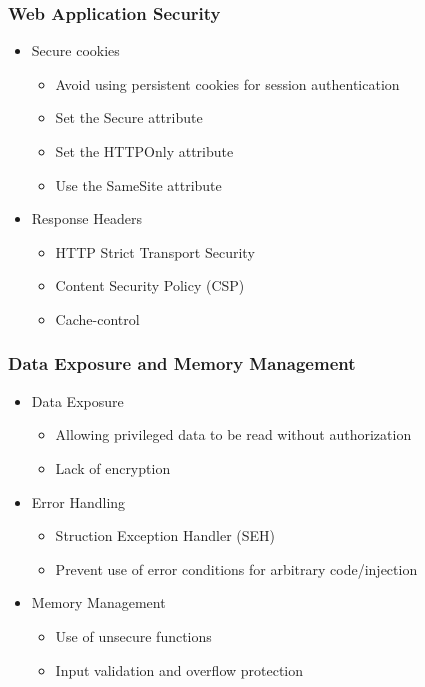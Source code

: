 		\subsubsection {Web Application Security}
			\begin{itemize}
				\item Secure cookies
					\begin{itemize}
						\item Avoid using persistent cookies for session authentication
						\item Set the Secure attribute
						\item Set the HTTPOnly attribute
						\item Use the SameSite attribute
					\end{itemize}
				\item Response Headers
					\begin{itemize}
						\item HTTP Strict Transport Security
						\item Content Security Policy (CSP)
						\item Cache-control
					\end{itemize}
			\end{itemize}
		\subsubsection {Data Exposure and Memory Management}
			\begin{itemize}
				\item Data Exposure
					\begin{itemize}
						\item Allowing privileged data to be read without authorization
						\item Lack of encryption
					\end{itemize}
				\item Error Handling
					\begin{itemize}
						\item Struction Exception Handler (SEH)
						\item Prevent use of error conditions for arbitrary code/injection
					\end{itemize}
				\item Memory Management
					\begin{itemize}
						\item Use of unsecure functions
						\item Input validation and overflow protection
					\end{itemize}
			\end{itemize}
